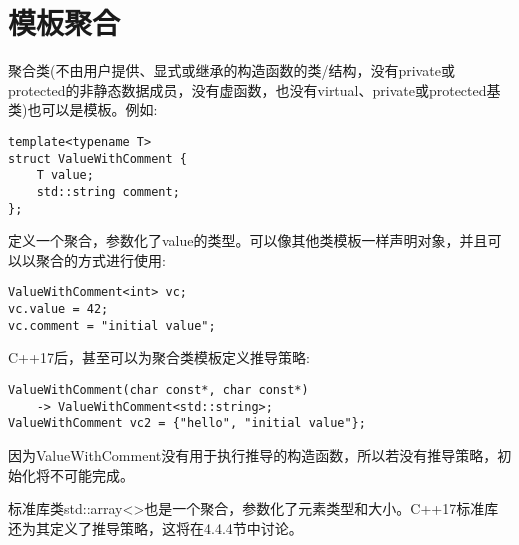 \section{模板聚合}

聚合类(不由用户提供、显式或继承的构造函数的类/结构，没有private或protected的非静态数据成员，没有虚函数，也没有virtual、private或protected基类)也可以是模板。例如:

\begin{lstlisting}[style=styleCXX]
template<typename T>
struct ValueWithComment {
	T value;
	std::string comment;
};
\end{lstlisting}

定义一个聚合，参数化了value的类型。可以像其他类模板一样声明对象，并且可以以聚合的方式进行使用:

\begin{lstlisting}[style=styleCXX]
ValueWithComment<int> vc;
vc.value = 42;
vc.comment = "initial value";
\end{lstlisting}

C++17后，甚至可以为聚合类模板定义推导策略:

\begin{lstlisting}[style=styleCXX]
ValueWithComment(char const*, char const*)
	-> ValueWithComment<std::string>;
ValueWithComment vc2 = {"hello", "initial value"};
\end{lstlisting}

因为ValueWithComment没有用于执行推导的构造函数，所以若没有推导策略，初始化将不可能完成。

标准库类std::array<>也是一个聚合，参数化了元素类型和大小。C++17标准库还为其定义了推导策略，这将在4.4.4节中讨论。
